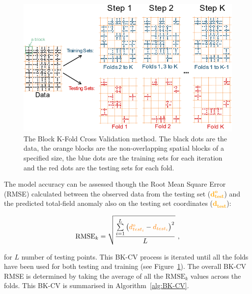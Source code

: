 \begin{figure}[!tb]
  \centering
  \includegraphics[width=1\linewidth]{paper/figures/bk_cv.png}
  \caption{
    The Block K-Fold Cross Validation method. The black dots are the data, the orange blocks are the non-overlapping spatial blocks of a specified size, the blue dots are the training sets for each iteration and the red dots are the testing sets for each fold.
    }
  \label{fig:BK-CV}
\end{figure}

The model accuracy can be assessed though the Root Mean Square Error (RMSE) calculated between the observed data from the testing set (\textcolor{orange}{$\mathbf{d^o_{test}}$}) and the predicted total-field anomaly also on the testing set coordinates (\textcolor{orange}{$\mathbf{d_{test}}$}):

\begin{equation}
    \label{eq:rmse}
    \text{RMSE}_k = \sqrt{\dfrac{\sum\limits_{i=1}^L \left(\textcolor{orange}{{d^o_{test_i}}} - \textcolor{orange}{{d_{test_i}}}\right)^2}{L}}
    \ ,
\end{equation}

\noindent
for $L$ number of testing points. This BK-CV process is iterated until all the folds have been used for both testing and training (see Figure~\ref{fig:BK-CV}). The overall BK-CV RMSE is determined by taking the average of all the $\text{RMSE}_k$ values across the folds. This BK-CV is summarised in Algorithm~\ref{alg:BK-CV}.


